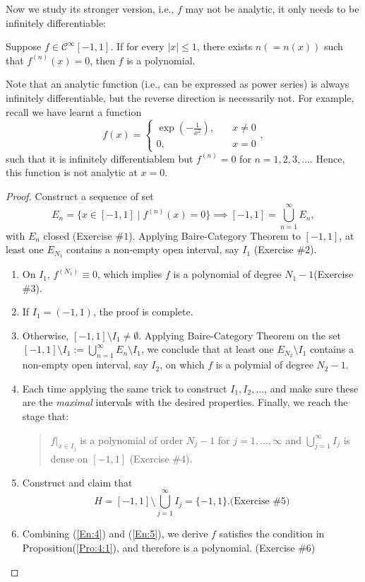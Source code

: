 Now we study its stronger version, i.e., $f$ may not be analytic, it only needs to be infinitely differentiable:
\begin{proposition}\label{Pro:4:1}
Suppose $f\in\mathcal{C}^\infty[-1,1]$. If for every $|x|\le1$, there exists $n(=n(x))$ such that $f^{(n)}(x)=0$, then $f$ is a polynomial.
\end{proposition}
\begin{remark}
Note that an analytic function (i.e., can be expressed as power series) is always infinitely differentiable, but the reverse direction is necessarily not. For example, recall we have learnt a function
\[
f(x)=\left\{
\begin{aligned}
\exp\left(-\frac{1}{x^2}\right),&\quad x\ne0\\
0,&\quad x=0
\end{aligned}
\right.,
\]
such that it is infinitely differentiablem but $f^{(n)}=0$ for $n=1,2,3,\dots$. Hence, this function is not analytic at $x=0$.
\end{remark}
\begin{proof}
Construct a sequence of set
\[
E_n = \{x\in[-1,1]\mid f^{(n)}(x)=0\}\implies
[-1,1]=\bigcup_{n=1}^\infty E_n,
\]
with $E_n$ closed (Exercise $\#1$). Applying Baire-Category Theorem to $[-1,1]$, at least one $E_{N_1}$ contains a non-empty open interval, say $I_1$ (Exercise $\#2$).
\begin{enumerate}
\item
On $I_1$, $f^{(N_1)}\equiv0$, which implies $f$ is a polynomial of degree $N_1-1$(Exercise $\#3$).
\item
If $I_1=(-1,1)$, the proof is complete.
\item
Otherwise, $[-1,1]\setminus I_1\ne\emptyset$. Applying Baire-Category Theorem on the set $[-1,1]\setminus I_1:=\bigcup_{n=1}^\infty E_n\setminus I_1$, we conclude that at least one $E_{N_2}\setminus I_1$ contains a non-empty open interval, say $I_2$, on which $f$ is a polymial of degree $N_2-1$.
\item\label{En:4}
Each time applying the same trick to construct $I_1,I_2,\dots$, and make sure these are the \emph{maximal} intervals with the desired properties. Finally, we reach the stage that:
\begin{quotation}
$f|_{x\in I_j}$ is a polynomial of order $N_j-1$ for $j=1,\dots,\infty$ and $\bigcup_{j=1}^\infty I_j$ is dense on $[-1,1]$ (Exercise $\#4$).
\end{quotation}
\item\label{En:5}
Construct and claim that 
\[
H=[-1,1]\setminus\bigcup_{j=1}^\infty I_j=\{-1,1\}. \mbox{(Exercise $\#5$)}
\]
\item
Combining (\ref{En:4}) and (\ref{En:5}), we derive $f$ satisfies the condition in Proposition(\ref{Pro:4:1}), and therefore is a polynomial. (Exercise $\#6$)
\end{enumerate}
\end{proof}
